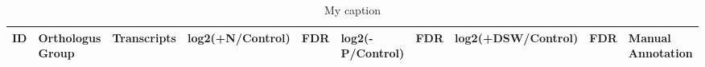 \begin{landscape}
\begin{table}[h!]
\begin{tabular}{lL{1.25cm}L{2cm}L{2.5cm}L{2cm}L{2cm}L{2cm}L{3cm}L{3cm}}
\end{tabular}
\end{table}
\end{landscape}





\begin{landscape}
\begin{center}


    \begin{footnotesize}
    
        \begin{longtable}{|p{0.5cm}|p{1.5cm}|p{4cm}|l|l|l|l|l|l|l|}

\caption{My caption}
\label{my-label}
\hline
\textbf{ID}  & \textbf{Orthologus Group} & \textbf{Transcripts}                                                                                                                                                                                                                                                                                                                                                                                                                                                                                                                                                                                                                     & \textbf{log2(+N/Control)} & \textbf{FDR} & \textbf{log2(-P/Control)} & \textbf{FDR} & \textbf{log2(+DSW/Control)} & \textbf{FDR} & \textbf{Manual Annotation}                                                   \\ \hline


\endhead


\end{longtable}
\end{footnotesize}
\end{center}
\end{landscape}
